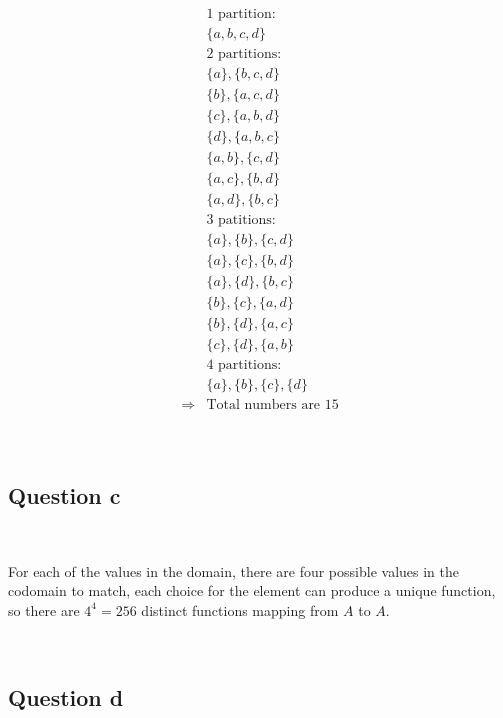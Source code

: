 \documentclass{article}
\begin{document}
~

\begin{equation*}
    \begin{split}
        &1\text{ partition}:\\
        &\{a,b,c,d\}\\
        &2\text{ partitions}:\\
        &\{a\},\{b,c,d\}\\
        &\{b\},\{a,c,d\}\\
        &\{c\},\{a,b,d\}\\
        &\{d\},\{a,b,c\}\\
        &\{a,b\},\{c,d\}\\
        &\{a,c\},\{b,d\}\\
        &\{a,d\},\{b,c\}\\
        &3\text{ patitions}:\\
        &\{a\},\{b\},\{c,d\}\\
        &\{a\},\{c\},\{b,d\}\\
        &\{a\},\{d\},\{b,c\}\\
        &\{b\},\{c\},\{a,d\}\\
        &\{b\},\{d\},\{a,c\}\\
        &\{c\},\{d\},\{a,b\}\\
        &4\text{ partitions}:\\
        &\{a\},\{b\},\{c\},\{d\}\\
        \Rightarrow&\text{Total numbers are }15\\
    \end{split}
\end{equation*}

~

\subsection*{Question c}

~

For each of the values in the domain, there are four possible values in the codomain to match, each choice for the element can produce a unique function, so there are $4^4=256$ distinct functions mapping from $A$ to $A$.

~

\subsection*{Question d}

~
\end{document}
